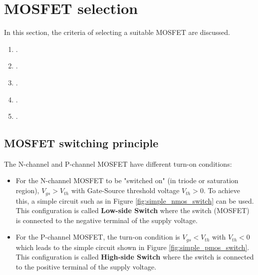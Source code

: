\documentclass[main.tex]{subfiles}
\begin{document}
    \section{MOSFET selection}
    \justify
    In this section, the criteria of selecting a suitable MOSFET are discussed.
    \begin{enumerate}
        \item {}.
        \item {}.
        \item {}.
        \item {}.
        \item {}.
    \end{enumerate}

    \pagebreak
    \subsection{MOSFET switching principle} \label{sec:switch_type}

    \justify
    The N-channel and P-channel MOSFET have different turn-on conditions:
    \begin{itemize}
        \item For the N-channel MOSFET to be  "switched on" (in triode or saturation region), $V_{gs} > V_{th}$ with Gate-Source threshold voltage $V_{th} > 0$. To achieve this, a simple circuit such as in Figure \ref{fig:simple_nmos_switch} can be used. This configuration is called \textbf{Low-side Switch} where  the switch (MOSFET) is connected to the negative terminal of the supply voltage.
        \item For the P-channel MOSFET, the turn-on condition is $V_{gs} < V_{th}$ with $V_{th} < 0$ which leads to the simple circuit shown in Figure \ref{fig:simple_pmos_switch}. This configuration is called \textbf{High-side Switch} where the switch is connected to the positive terminal of the supply voltage.
    \end{itemize}
     
\end{document}
